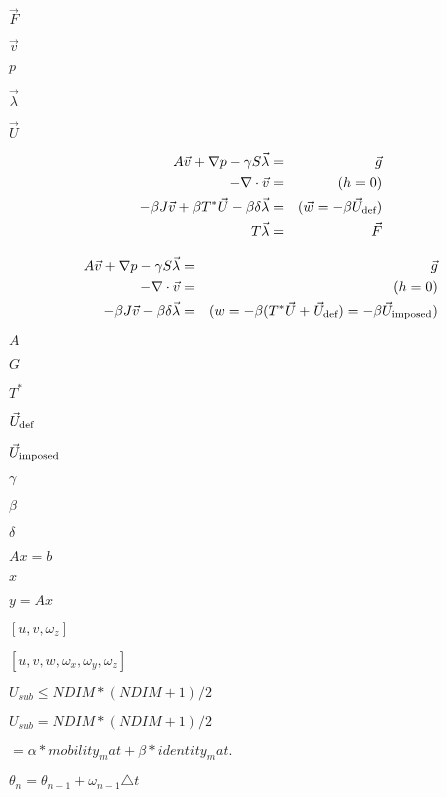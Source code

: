\documentclass{article}
\begin{document}
$ \vec{F} $
\pagebreak

$ \vec{v} $
\pagebreak

$ p $
\pagebreak

$ \vec{\lambda} $
\pagebreak

$ \vec{U} $
\pagebreak

\begin{eqnarray*} A \vec{v} + \nabla p - \gamma S \vec{\lambda} &=& \vec{g} \\ -\nabla \cdot \vec{v} &=& (h = 0) \\ -\beta J \vec{v} + \beta T^{*} \vec{U} -\beta \delta \vec{\lambda} &=& (\vec{w} = -\beta \vec{U}_{\mbox{\scriptsize def}}) \\ T \vec{\lambda} &=& \vec{F} \end{eqnarray*}
\pagebreak

\begin{eqnarray*} A \vec{v} + \nabla p - \gamma S \vec{\lambda} &=& \vec{g} \\ -\nabla \cdot \vec{v} &=& (h = 0) \\ -\beta J \vec{v} - \beta \delta \vec{\lambda} &=& (w = -\beta (T^{*}\vec{U}+ \vec{U}_{\mbox{\scriptsize def}}) = -\beta \vec{U}_{\mbox{\scriptsize imposed}}) \end{eqnarray*}
\pagebreak

$ A $
\pagebreak

$ G $
\pagebreak

$ T^{*} $
\pagebreak

$ \vec{U}_{\mbox{\scriptsize def}} $
\pagebreak

$ \vec{U}_{\mbox{\scriptsize imposed}} $
\pagebreak

$ \gamma $
\pagebreak

$ \beta $
\pagebreak

$ \delta $
\pagebreak

$Ax=b$
\pagebreak

$x$
\pagebreak

$y=Ax$
\pagebreak

$[u,v,\omega_z]$
\pagebreak

$[u,v,w,\omega_x,\omega_y,\omega_z]$
\pagebreak

$ U_{sub} \leq NDIM * (NDIM + 1) / 2 $
\pagebreak

$ U_{sub} = NDIM * (NDIM + 1) / 2 $
\pagebreak

$ = \alpha * mobility_mat + \beta * identity_mat. $
\pagebreak

$ \theta_n = \theta_{n-1} + \omega_{n-1} \triangle t $
\pagebreak
\end{document}

